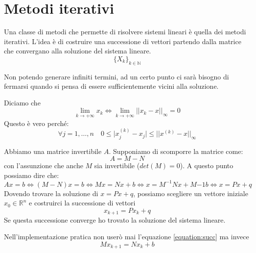 \section{Metodi iterativi}
Una classe di metodi che permette di risolvere sistemi lineari è quella dei metodi iterativi. L'idea è di costruire una successione di vettori partendo dalla matrice che convergano alla soluzione del sistema lineare.
\begin{equation*}
	\{X_k\}_{k\in \mathbb{N}}
\end{equation*}
\begin{observation}
	Non potendo generare infiniti termini, ad un certo punto ci sarà bisogno di fermarsi quando si pensa di essere sufficientemente vicini alla soluzione.
\end{observation}
Diciamo che
\begin{equation}
	\lim_{k\to +\infty}x_k \Leftrightarrow \lim_{k\to +\infty} \lvert\lvert x_k - x\rvert\rvert_{\infty} = 0
\end{equation}
\noindent Questo è vero perché:
\begin{equation*}
	\forall j = 1, \ldots, n \quad 0 \leq \lvert x^{(k)}_j - x_j \rvert \leq \lvert\lvert x^{(k)} - x\rvert\rvert_{\infty}
\end{equation*}

Abbiamo una matrice invertibile $A$. Supponiamo di scomporre la matrice come:
\begin{equation}
	A=M-N
\end{equation}
con l'assunzione che anche $M$ sia invertibile ($det(M)=0$). A questo punto possiamo dire che:
\begin{equation*}
	Ax=b \Leftrightarrow (M-N)x = b\Leftrightarrow Mx=Nx+b \Leftrightarrow x=M^{-1}Nx + M{-1}b \Leftrightarrow x=Px+q
\end{equation*}
Dovendo trovare la soluzione di $x=Px+q$, possiamo scegliere un vettore iniziale $x_0 \in \mathbb{R}^n$ e costruirci la successione di vettori
\begin{equation}
	\label{equation:succ}
	x_{k+1}=Px_k + q
\end{equation}
Se questa successione converge ho trovato la soluzione del sistema lineare.
\begin{observation}
	Nell'implementazione pratica non userò mai l'equazione \ref{equation:succ} ma invece
	\begin{equation}
		Mx_{k+1}=Nx_k + b
	\end{equation}
\end{observation}

